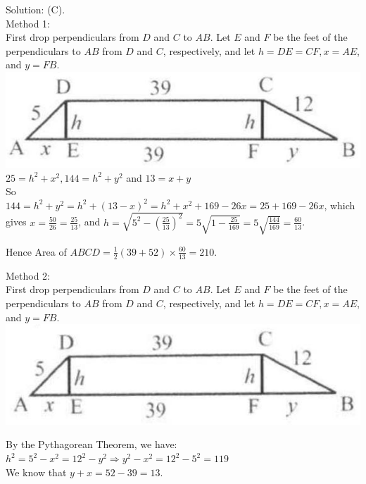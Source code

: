 \documentclass[10pt]{article}
\begin{document}
Solution: (C).\\
Method 1:\\
First drop perpendiculars from \(D\) and \(C\) to \(A B\). Let \(E\) and \(F\) be the feet of the perpendiculars to \(A B\) from \(D\) and \(C\), respectively, and let \(h=D E=C F, x=A E\), and \(y=F B\).\\
\includegraphics[max width=\textwidth, center]{2025_04_17_97bc1f7e44d93c271a88g-077}\\
\(25=h^{2}+x^{2}, 144=h^{2}+y^{2}\) and \(13=x+y\)\\
So\\
\(144=h^{2}+y^{2}=h^{2}+(13-x)^{2}=h^{2}+x^{2}+169-26 x=25+169-26 x\), which gives \(x=\frac{50}{26}=\frac{25}{13}\), and \(h=\sqrt{5^{2}-\left(\frac{25}{13}\right)^{2}}=5 \sqrt{1-\frac{25}{169}}=5 \sqrt{\frac{144}{169}}=\frac{60}{13}\).


Hence Area of \(A B C D=\frac{1}{2}(39+52) \times \frac{60}{13}=210\).

Method 2:\\
First drop perpendiculars from \(D\) and \(C\) to \(A B\). Let \(E\) and \(F\) be the feet of the perpendiculars to \(A B\) from \(D\) and \(C\), respectively, and let \(h=D E=C F, x=A E\), and \(y=F B\).\\
\includegraphics[max width=\textwidth, center]{2025_04_17_97bc1f7e44d93c271a88g-078(1)}

By the Pythagorean Theorem, we have:\\
\(h^{2}=5^{2}-x^{2}=12^{2}-y^{2} \Rightarrow y^{2}-x^{2}=12^{2}-5^{2}=119\)\\
We know that \(y+x=52-39=13\).
\end{document}
